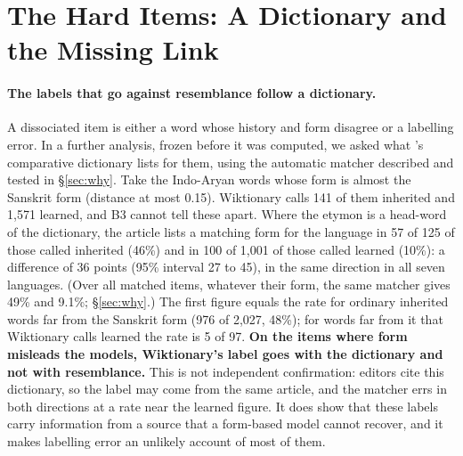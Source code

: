 \documentclass[11pt]{article}
\begin{document}
\section{The Hard Items: A Dictionary and the Missing Link}
\label{sec:link}

\paragraph{The labels that go against resemblance follow a dictionary.} A dissociated item is either a word whose history and form disagree or a labelling error. In a further analysis, frozen before it was computed, we asked what \citeauthor{turner1966cdial}'s comparative dictionary lists for them, using the automatic matcher described and tested in \S\ref{sec:why}. Take the Indo-Aryan words whose form is almost the Sanskrit form (distance at most 0.15). Wiktionary calls 141 of them inherited and 1,571 learned, and B3 cannot tell these apart. Where the etymon is a head-word of the dictionary, the article lists a matching form for the language in 57 of 125 of those called inherited (46\%) and in 100 of 1,001 of those called learned (10\%): a difference of 36 points (95\% interval 27 to 45), in the same direction in all seven languages. (Over all matched items, whatever their form, the same matcher gives 49\% and 9.1\%; \S\ref{sec:why}.) The first figure equals the rate for ordinary inherited words far from the Sanskrit form (976 of 2,027, 48\%); for words far from it that Wiktionary calls learned the rate is 5 of 97. \textbf{On the items where form misleads the models, Wiktionary's label goes with the dictionary and not with resemblance.} This is not independent confirmation: editors cite this dictionary, so the label may come from the same article, and the matcher errs in both directions at a rate near the learned figure. It does show that these labels carry information from a source that a form-based model cannot recover, and it makes labelling error an unlikely account of most of them.
\end{document}
